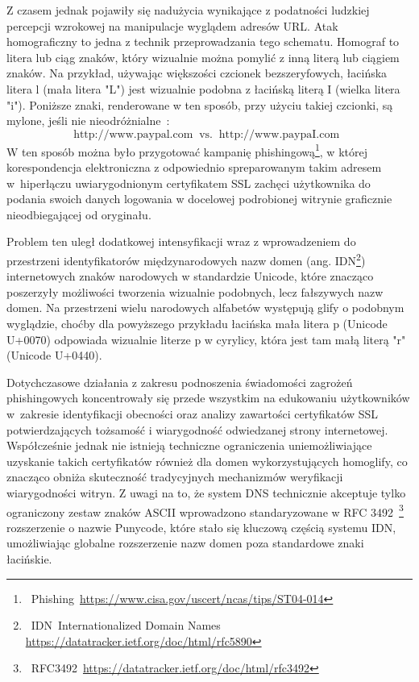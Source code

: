 Z czasem jednak pojawiły się nadużycia wynikające z podatności ludzkiej percepcji wzrokowej na manipulacje wyglądem adresów URL. Atak homograficzny to jedna z technik przeprowadzania tego schematu. Homograf to litera lub ciąg znaków, który wizualnie można pomylić z inną literą lub ciągiem znaków. Na przykład, używając większości czcionek bezszeryfowych, łacińska litera l (mała litera "L") jest wizualnie podobna z łacińską literą I (wielka litera "i"). Poniższe znaki, renderowane w ten sposób, przy użyciu takiej czcionki, są mylone, jeśli nie nieodróżnialne~\cite{Holgers2006}:
\[
\text {http://www.paypal.com} \;\; \text{vs.}\;\; \text{http://www.paypaI.com} \;\; 
\] %
W ten sposób można było przygotować kampanię phishingową\footnote{~Phishing~\url{https://www.cisa.gov/uscert/ncas/tips/ST04-014}}, w której korespondencja elektroniczna z odpowiednio spreparowanym takim adresem w~hiperłączu uwiarygodnionym certyfikatem SSL zachęci użytkownika do podania swoich danych logowania w docelowej podrobionej witrynie graficznie nieodbiegającej od oryginału.

Problem ten uległ dodatkowej intensyfikacji wraz z wprowadzeniem do przestrzeni identyfikatorów międzynarodowych nazw domen (ang. IDN\footnote{~IDN~Internationalized Domain Names \url{https://datatracker.ietf.org/doc/html/rfc5890}}) internetowych znaków narodowych w standardzie Unicode, które znacząco poszerzyły możliwości tworzenia wizualnie podobnych, lecz fałszywych nazw domen. Na przestrzeni wielu narodowych alfabetów występują glify o podobnym wyglądzie, choćby dla powyższego przykładu łacińska mała litera p (Unicode U+0070) odpowiada wizualnie literze p w cyrylicy, która jest tam małą literą "r" (Unicode U+0440)\cite{Holgers2006}.

Dotychczasowe działania z zakresu podnoszenia świadomości zagrożeń phishingowych koncentrowały się przede wszystkim na edukowaniu użytkowników w~zakresie identyfikacji obecności oraz analizy zawartości certyfikatów SSL potwierdzających tożsamość i wiarygodność odwiedzanej strony internetowej. Współcześnie jednak nie istnieją techniczne ograniczenia uniemożliwiające uzyskanie takich certyfikatów również dla domen wykorzystujących homoglify, co znacząco obniża skuteczność tradycyjnych mechanizmów weryfikacji wiarygodności witryn. 
Z uwagi na to, że system DNS technicznie akceptuje tylko ograniczony zestaw znaków ASCII wprowadzono standaryzowane w RFC 3492~\footnote{~RFC3492~\url{https://datatracker.ietf.org/doc/html/rfc3492}} rozszerzenie o nazwie Punycode, które stało się kluczową częścią systemu IDN, umożliwiając globalne rozszerzenie nazw domen poza standardowe znaki łacińskie.

